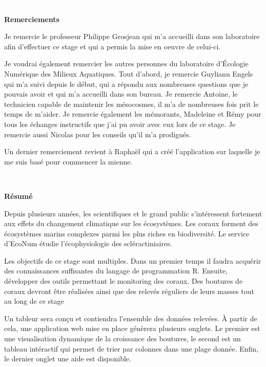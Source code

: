\documentclass[]{report}
\begin{document}
\null
\newpage

\textcolor{white}{.}

\Huge 
{\bf Remerciements} \vspace{1 cm}

\normalsize
Je remercie le professeur Philippe Grosjean qui m'a accueilli dans son
laboratoire afin d'effectuer ce stage et qui a permis la mise en oeuvre
de celui-ci.

Je voudrai également remercier les autres personnes du laboratoire
d'Écologie Numérique des Milieux Aquatiques. Tout d'abord, je remercie
Guyliann Engels qui m'a suivi depuis le début, qui a répondu aux
nombreuses questions que je pouvais avoir et qui m'a accueilli dans son
bureau. Je remercie Antoine, le technicien capable de maintenir les
mésocosmes, il m'a de nombreuses fois prit le temps de m'aider. Je
remercie également les mémorants, Madeleine et Rémy pour tous les
échanges instructifs que j'ai pu avoir avec eux lors de ce stage. Je
remercie aussi Nicolas pour les conseils qu'il m'a prodigués.

Un dernier remerciement revient à Raphaël qui a créé l'application sur
laquelle je me suis basé pour commencer la mienne. \vfill
\null
\newpage

\textcolor{white}{.}

\Huge 
{\bf Résumé} \vspace{1 cm}

\normalsize

Depuis plusieurs années, les scientifiques et le grand public
s'intéressent fortement aux effets du changement climatique sur les
écosystèmes. Les coraux forment des écosystèmes marins complexes parmi
les plus riches en biodiversité. Le service d'EcoNum étudie
l'écophysiologie des scléractiniaires.

Les objectifs de ce stage sont multiples. Dans un premier temps il
faudra acquérir des connaissances suffisantes du langage de
programmation R. Ensuite, développer des outils permettant le monitoring
des coraux. Des boutures de coraux devront être réalisées ainsi que des
relevés réguliers de leurs masses tout au long de ce stage

Un tableur sera conçu et contiendra l'ensemble des données relevées. À
partir de cela, une application web mise en place génèrera plusieurs
onglets. Le premier est une visualisation dynamique de la croissance des
boutures, le second est un tableau intéractif qui permet de trier par
colonnes dans une plage donnée. Enfin, le dernier onglet une aide est
disponible.
\end{document}
